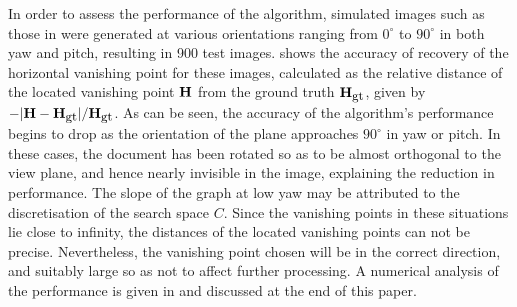 {%

In order to assess the performance of the algorithm, simulated images such as those in  were generated at various orientations ranging from $0^\circ$ to $90^\circ$ in both yaw and pitch, resulting in 900 test images.
 shows the accuracy of recovery of the horizontal vanishing point for these images,
calculated as the relative distance of the located vanishing point ${ \bf H }$ from the ground truth ${ \bf H }_{\mbox{\small gt}}$, given by $-|{ \bf H }-{ \bf H }_{\mbox{\small gt}}|/{ \bf H }_{\mbox{\small gt}}$.
As can be seen, the accuracy of the algorithm's performance begins to drop as the orientation of the plane approaches $90^\circ$ in yaw or pitch.
In these cases, the document has been rotated so as to be almost orthogonal to the view plane, and hence nearly invisible in the image, explaining the reduction in performance.
The slope of the graph at low yaw may be attributed to the discretisation of the search space $C$.
Since the vanishing points in these situations lie close to infinity, the distances of the located vanishing points can not be precise.
Nevertheless, the vanishing point chosen will be in the correct direction, and suitably large so as not to affect further processing.
A numerical analysis of the performance is given in  and discussed at the end of this paper.
}

